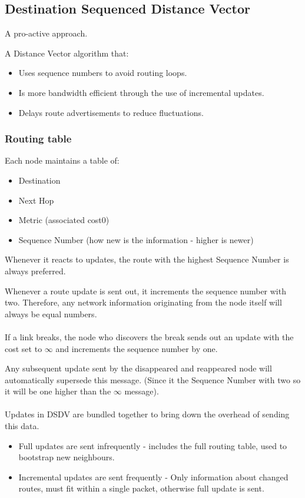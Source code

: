 	\subsection{Destination Sequenced Distance Vector}
	A pro-active approach.
	
	A Distance Vector algorithm that:
	\begin{itemize}
		\item Uses sequence numbers to avoid routing loops.
		\item Is more bandwidth efficient through the use of incremental updates.
		\item Delays route advertisements to reduce fluctuations.
	\end{itemize}
	
	\subsubsection{Routing table}
	Each node maintains a table of:
	\begin{itemize}
		\item Destination
		\item Next Hop
		\item Metric (associated cost0)
		\item Sequence Number (how new is the information - higher is newer)
	\end{itemize}
	Whenever it reacts to updates, the route with the highest Sequence Number is always preferred.
	
	Whenever a route update is sent out, it increments the sequence number with two. Therefore, any network information originating from the node itself will always be equal numbers.
	\\
	\\
	If a link breaks, the node who discovers the break sends out an update with the cost set to $\infty$ and increments the sequence number by one.
	
	Any subsequent update sent by the disappeared and reappeared node will automatically supersede this message. (Since it the Sequence Number with two so it will be one higher than the $\infty$ message).
	\\
	\\
	Updates in DSDV are bundled together to bring down the overhead of sending this data.
	\begin{itemize}
		\item Full updates are sent infrequently - includes the full routing table, used to bootstrap new neighbours.
		\item Incremental updates are sent frequently - Only information about changed routes, must fit within a single packet, otherwise full update is sent.
	\end{itemize}
	
